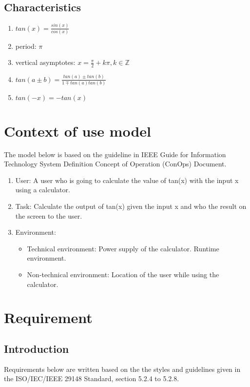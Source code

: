\documentclass{article}
\begin{document}
\subsection{Characteristics}
\begin{enumerate}
    \item $tan(x)=\frac{sin(x)}{cos(x)}$
    \item period: $\pi$
    \item vertical asymptotes: $x=\frac{\pi}{2}+k\pi, k\in\mathbb{Z}$
    \item $tan(a\pm b)=\frac{tan(a)\pm tan(b)}{1\mp tan(a)tan(b)}$
    \item $tan(-x)=-tan(x)$
\end{enumerate}

\section{Context of use model}
The model below is based on the guideline in IEEE Guide for Information Technology System Definition Concept of Operation (ConOps) Document.\cite{1998ieee}
\begin{enumerate}
    \item User: A user who is going to calculate the value of tan(x) with the input x using a calculator.
    \item Task: Calculate the output of tan(x) given the input x and who the result on the screen to the user.
    \item Environment:
    \begin{itemize}
        \item Technical environment: Power supply of the calculator. Runtime environment.
        \item Non-technical environment: Location of the user while using the calculator.
    \end{itemize}
\end{enumerate}


\newpage
{}
\section{Requirement}

\subsection{Introduction}
Requirements below are written based on the the styles and guidelines given in the ISO/IEC/IEEE 29148 Standard, section 5.2.4 to 5.2.8.\cite{8559686}
\end{document}
